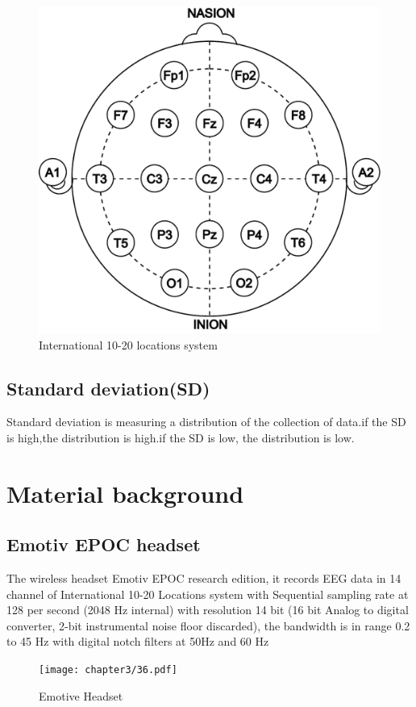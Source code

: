 \begin{figure}[h]
	\centering
	\includegraphics[scale = 0.4]{chapter3/35.pdf}
	\caption{International 10-20 locations system}
\end{figure}

\subsection{Standard deviation(SD)}
\hspace{1.5cm}Standard deviation is measuring a distribution of the collection of data.if the SD is high,the distribution is high.if the SD is low, the distribution is low.



\newpage
\section{Material background}

\subsection{Emotiv EPOC headset\cite{ref12}}

\hspace{1.5cm} The wireless headset Emotiv EPOC research edition, it records EEG data in 14 channel of International 10-20 Locations system with Sequential sampling rate at 128 per second (2048 Hz internal) with resolution 14 bit (16 bit Analog to digital converter, 2-bit instrumental noise floor discarded), the bandwidth is in range 0.2 to 45 Hz with digital notch filters at 50Hz and 60 Hz
\begin{figure}[h]
	\centering
	\texttt{[image: chapter3/36.pdf]}
	\caption{Emotive Headset}
\end{figure}

